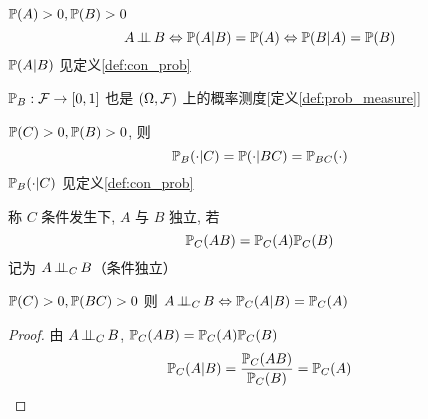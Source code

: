 \begin{theorem}
    $\mathbb{P}(A)>0,\mathbb{P}(B)>0$
    \[
    A\operatorname{\perp\!\!\!\perp} B\Leftrightarrow \mathbb{P}(A|B)=\mathbb{P}(A)\Leftrightarrow \mathbb{P}(B|A)=\mathbb{P}(B)
    \]
    $\mathbb{P}(A|B)$ 见定义\ref{def:con_prob}
\end{theorem}

\begin{theorem}
    $\mathbb{P}_B:\mathcal{F}\rightarrow [0,1]$ 也是 $(\Omega, \mathcal{F})$ 上的概率测度[定义\ref{def:prob_measure}]
\end{theorem}

\begin{property}
$\mathbb{P}(C)>0, \mathbb{P}(B)>0$, 则 
\[
\mathbb{P}_B(\cdot|C)=\mathbb{P}(\cdot |BC)=\mathbb{P}_{BC}(\cdot)
\]
$\mathbb{P}_B(\cdot|C)$ 见定义\ref{def:con_prob}
\end{property}

\begin{definition}
    称 $C$ 条件发生下, $A$ 与 $B$ 独立, 若
    \begin{equation}
		\mathbb{P}_C(AB)=\mathbb{P}_C(A)\mathbb{P}_C(B)
		\label{eq:con_indep}
		\end{equation}
    记为 $A\operatorname{\perp\!\!\!\perp}_C B$（条件独立）
\end{definition}

\begin{theorem}
    $\mathbb{P}(C)>0, \mathbb{P}(BC)>0$ 则 $A\operatorname{\perp\!\!\!\perp}_C B \Leftrightarrow \mathbb{P}_C(A|B)=\mathbb{P}_C(A)$
\end{theorem}
\begin{proof}
由 $A\operatorname{\perp\!\!\!\perp}_C B$, $\mathbb{P}_C(AB)=\mathbb{P}_C(A)\mathbb{P}_C(B)$
\[
\mathbb{P}_C(A|B)=\frac{\mathbb{P}_C(AB)}{\mathbb{P}_C(B)}=\mathbb{P}_C(A)
\]
\end{proof}
\newpage